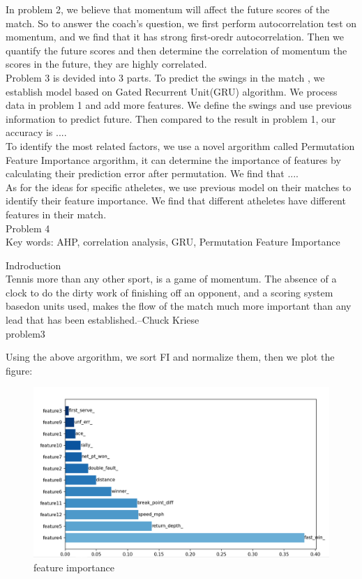 \documentclass[12pt, a4paper, oneside]{article}
\theoremstyle{break}
\begin{document}
In problem 2, we believe that momentum will affect the future scores of the match. So to answer the coach's question, 
we first perform autocorrelation test on momentum, and we find that it has strong first-oredr autocorrelation. Then we quantify 
the future scores and then determine the correlation of momentum the scores in the future, they are highly correlated.\\

Problem 3 is devided into 3 parts. To predict the swings in the match , we establish model based on Gated Recurrent Unit(GRU) algorithm.
We process data in problem 1 and add more features. We define the swings and use previous information to predict future.
Then compared to the result in problem 1, our accuracy is ....\\

To identify the most related factors, we use a novel argorithm called Permutation Feature Importance argorithm, 
it can determine the importance of features by calculating their prediction error after permutation. We find that ....\\

As for the ideas for specific atheletes, we use previous model on their matches to identify their feature importance.
We find that different atheletes have different features in their match.\\

Problem 4\\

Key words: AHP, correlation analysis, GRU, Permutation Feature Importance

Indroduction\\
Tennis more than any other sport, is a game of momentum. 
The absence of a clock to do the dirty work of finishing off an opponent, 
and a scoring system basedon units used, makes the flow of the match much more important than any 
lead that has been established.--Chuck Kriese\\

problem3

Using the above argorithm, we sort FI and normalize them, then we plot the figure:

\begin{figure}[H]
    \centering
    \includegraphics[scale=0.6]{imgs/8.png}
    \caption{feature importance}
\end{figure}
\end{document}
